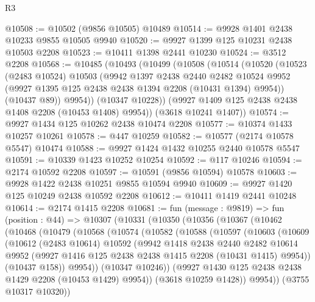 \begin{lexlean}{R3}
\begin{coremodule}
@10508 := @10502 (@9856 @10505) @10489
@10514 := @9928 @1401 @2438 @10233 @9855 @10505 @9940
@10520 := @9927 @1399 @125 @10231 @2438 @10503 @2208
@10523 := @10411 @1398 @2441 @10230
@10524 := @3512 @2208
@10568 := @10485
    (@10493
      (@10499
        (@10508
          (@10514
            (@10520
              (@10523
                (@2483 @10524)
                @10503
                (@9942
                  @1397
                  @2438
                  @2440
                  @2482
                  @10524
                  @9952
                  (@9927 @1395 @125 @2438 @2438 @1394 @2208 (@10431 @1394) @9954))
                (@10437 @89))
              @9954))
          (@10347 @10228))
        (@9927 @1409 @125 @2438 @2438 @1408 @2208 (@10453 @1408) @9954))
      (@3618 @10241 @1407))
@10574 := @9927 @1434 @125 @10262 @2438 @10474 @2208
@10577 := @10374 @1433 @10257 @10261
@10578 := @447 @10259
@10582 := @10577 (@2174 @10578 @5547) @10474
@10588 := @9927 @1424 @1432 @10255 @2440 @10578 @5547
@10591 := @10339 @1423 @10252 @10254
@10592 := @117 @10246
@10594 := @2174 @10592 @2208
@10597 := @10591 (@9856 @10594) @10578
@10603 := @9928 @1422 @2438 @10251 @9855 @10594 @9940
@10609 := @9927 @1420 @125 @10249 @2438 @10592 @2208
@10612 := @10411 @1419 @2441 @10248
@10614 := @2174 @1415 @2208
@10681 := fun (message : @9819) =>
  fun (position : @44) =>
  @10307
    (@10331
      (@10350
        (@10356
          (@10367
            (@10462
              (@10468
                (@10479
                  (@10568
                    (@10574
                      (@10582
                        (@10588
                          (@10597
                            (@10603
                              (@10609
                                (@10612
                                  (@2483 @10614)
                                  @10592
                                  (@9942
                                    @1418
                                    @2438
                                    @2440
                                    @2482
                                    @10614
                                    @9952
                                    (@9927 @1416 @125 @2438 @2438 @1415 @2208 (@10431 @1415) @9954))
                                  (@10437 @158))
                                @9954))
                            (@10347 @10246))
                          (@9927 @1430 @125 @2438 @2438 @1429 @2208 (@10453 @1429) @9954))
                        (@3618 @10259 @1428))
                      @9954))
                  (@3755 @10317 @10320))

\end{coremodule}
\end{lexlean}
